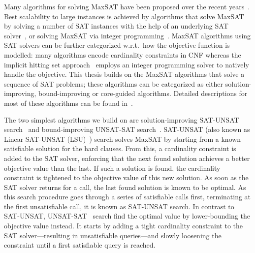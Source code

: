 Many algorithms for solving MaxSAT have been proposed over the recent years~\autocites{DBLP:conf/sat/FuM06,DBLP:journals/jsat/BerreP10,DBLP:conf/cp/MorgadoDM14,DBLP:journals/jsat/IgnatievMM19,DBLP:conf/cp/DaviesB11}.
Best scalability to large instances is achieved by algorithms that solve MaxSAT by solving a number of SAT instances with the help of an underlying SAT solver~\autocite{handbook2-cdcl}, or solving MaxSAT via integer programming~\autocite{handbook2-maxsat}.
MaxSAT algorithms using SAT solvers can be further categorized w.r.t.\ how the objective function is modelled:
many algorithms encode cardinality constraints in CNF whereas the implicit hitting set approach~\autocites{DBLP:conf/cp/DaviesB13,DBLP:conf/sat/DaviesB13,DBLP:conf/cp/DaviesB11,DBLP:conf/sat/BergBP20} employs an integer programming solver to natively handle the objective.
This thesis builds on the MaxSAT algorithms that solve a sequence of SAT problems;
these algorithms can be categorized as either solution-improving, bound-improving or core-guided algorithms.
Detailed descriptions for most of these algorithms can be found in~\autocite{handbook2-maxsat}.

The two simplest algorithms we build on are solution-improving SAT-UNSAT search~\autocite{DBLP:journals/jsat/BerreP10} and bound-improving UNSAT-SAT search~\autocite{DBLP:conf/sat/FuM06}.
SAT-UNSAT (also known as Linear SAT-UNSAT (LSU)~\autocite{handbook2-maxsat}) search solves MaxSAT by starting from a known satisfiable solution for the hard clauses.
From this, a cardinality constraint is added to the SAT solver, enforcing that the next found solution achieves a better objective value than the last.
If such a solution is found, the cardinality constraint is tightened to the objective value of this new solution.
As soon as the SAT solver returns \unsat{} for a call, the last found solution is known to be optimal.
As this search procedure goes through a series of satisfiable calls first, terminating at the first unsatisfiable call, it is known as SAT-UNSAT search.
In contrast to SAT-UNSAT, UNSAT-SAT~\autocites{DBLP:conf/sat/FuM06,DBLP:journals/tcad/XuRS03} search find the optimal value by lower-bounding the objective value instead.
It starts by adding a tight cardinality constraint to the SAT solver---resulting in unsatisfiable queries---and slowly loosening the constraint until a first satisfiable query is reached.

